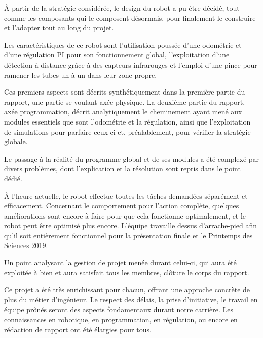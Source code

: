 \documentclass[a4paper,11pt]{article}
\begin{document}
À partir de la stratégie considérée, le design du robot a pu être décidé, tout comme les composants qui le composent désormais, pour finalement le construire et l'adapter tout au long du projet.

Les caractéristiques de ce robot sont l'utilisation poussée d'une odométrie et d'une régulation PI pour son fonctionnement global, l'exploitation d'une détection à distance grâce à des capteurs infrarouges et l'emploi d'une pince pour ramener les tubes un à un dans leur zone propre.

Ces premiers aspects sont décrits synthétiquement dans la première partie du rapport, une partie se voulant axée physique. La deuxième partie du rapport, axée programmation, décrit analytiquement le cheminement ayant mené aux modules essentiels que sont l'odométrie et la régulation, ainsi que l'exploitation de simulations pour parfaire ceux-ci et, préalablement, pour vérifier la stratégie globale.

Le passage à la réalité du programme global et de ses modules a été complexé par divers problèmes, dont l'explication et la résolution sont repris dans le point dédié. 

À l'heure actuelle, le robot effectue toutes les tâches demandées séparément et efficacement. Concernant le comportement pour l'action complète, quelques améliorations sont encore à faire pour que cela fonctionne optimalement, et le robot peut être optimisé plus encore. L'équipe travaille dessus d'arrache-pied afin qu'il soit entièrement fonctionnel pour la présentation finale et le Printemps des Sciences 2019.

Un point analysant la gestion de projet menée durant celui-ci, qui aura été exploitée à bien et aura satisfait tous les membres, clôture le corps du rapport.

Ce projet a été très enrichissant pour chacun, offrant une approche concrète de plus du métier d'ingénieur. Le respect des délais, la prise d'initiative, le travail en équipe prônés seront des aspects fondamentaux durant notre carrière. Les connaissances en robotique, en programmation, en régulation, ou encore en rédaction de rapport ont été élargies pour tous.


\cleardoublepage
\printbibliography[heading=bibintoc, title={Bibliographie}]
\end{document}
